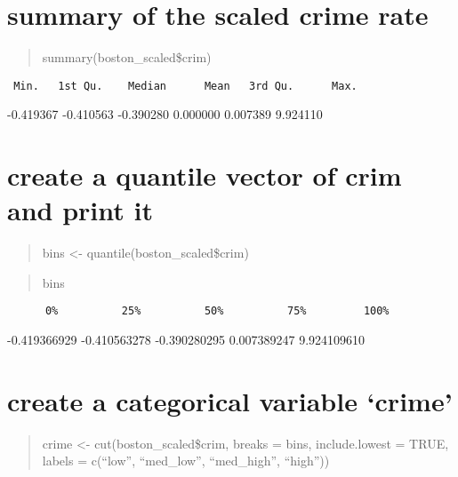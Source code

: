\documentclass[]{article}
\begin{document}
\section{summary of the scaled crime
rate}\label{summary-of-the-scaled-crime-rate-1}

\begin{quote}
summary(boston\_scaled\$crim)
\end{quote}

\begin{verbatim}
 Min.   1st Qu.    Median      Mean   3rd Qu.      Max.  
\end{verbatim}

-0.419367 -0.410563 -0.390280 0.000000 0.007389 9.924110

\begin{quote}
\end{quote}

\section{create a quantile vector of crim and print
it}\label{create-a-quantile-vector-of-crim-and-print-it-1}

\begin{quote}
bins \textless{}- quantile(boston\_scaled\$crim)
\end{quote}

\begin{quote}
bins
\end{quote}

\begin{verbatim}
      0%          25%          50%          75%         100%  
\end{verbatim}

-0.419366929 -0.410563278 -0.390280295 0.007389247 9.924109610

\begin{quote}
\end{quote}

\section{\texorpdfstring{create a categorical variable
`crime'}{create a categorical variable crime}}\label{create-a-categorical-variable-crime-1}

\begin{quote}
crime \textless{}- cut(boston\_scaled\$crim, breaks = bins,
include.lowest = TRUE, labels = c(``low'', ``med\_low'', ``med\_high'',
``high''))
\end{quote}
\end{document}
